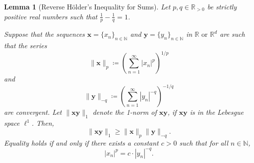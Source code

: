 \documentclass[10pt]{article} %
\newtheorem{lemma}{Lemma}[section]
\def\rvx{{\mathbf{x}}}
\def\rvy{{\mathbf{y}}}
\newcommand{\R}{\mathbb{R}}
\begin{document}
\begin{lemma}[Reverse Hölder's Inequality for Sums]\label{lemma: reverse holder}
Let $ p, q \in \R_{>0} $ be strictly positive real numbers such that $ \frac{1}{p} - \frac{1}{q} = 1 $.

Suppose that the sequences $ \rvx = \{x_n\}_{n\in \mathbb{N}} $ and $ \rvy = \{y_n\}_{n\in \mathbb{N}} $ in $ \mathbb{R} \text{ or } \R^d $ are such that the series
\begin{equation}
 \|\rvx\|_p \coloneqq \left( \sum_{n=1}^{\infty} |x_n|^p \right)^{1/p}
\end{equation}
and
\begin{equation}
\|\rvy\|_{-q} \coloneqq \left( \sum_{n=1}^{\infty} |y_n|^{-q} \right)^{-1/q}
\end{equation}
are convergent. Let $ \|\rvx\rvy\|_1 $ denote the 1-norm of $ \rvx\rvy $, if $ \rvx\rvy $ is in the Lebesgue space $ \ell^1 $. Then,
\begin{equation}
\|\rvx\rvy\|_1 \geq \|\rvx\|_p \|\rvy\|_{-q}.
\end{equation}
Equality holds if and only if there exists a constant $ c > 0 $ such that for all $n \in \mathbb{N}$,
\begin{equation}
|x_n|^p = c \cdot |y_n|^{-q}.
\end{equation}
\end{lemma}
\end{document}
